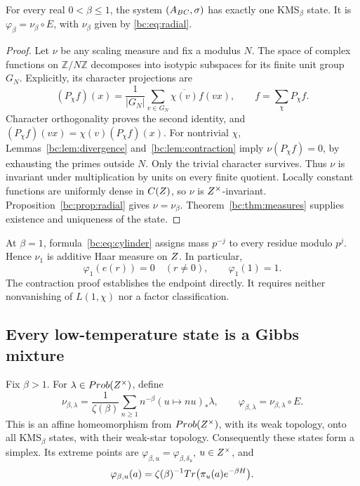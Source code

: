 \begin{theorem}\label{bc:thm:high}
For every real \(0<\beta\leq1\), the system \((A_{BC},\sigma)\) has
exactly one KMS\(_\beta\) state. It is
\(\varphi_\beta=\nu_\beta\circ E\), with \(\nu_\beta\) given by
\eqref{bc:eq:radial}.
\end{theorem}

\begin{proof}
Let \(\nu\) be any scaling measure and fix a modulus \(N\).
The space of complex functions on \(\mathbb Z/N\mathbb Z\) decomposes
into isotypic subspaces for its finite unit group \(G_N\).
Explicitly, its character projections are
\[
 (P_\chi f)(x)=\frac1{|G_N|}\sum_{v\in G_N}
                         \overline{\chi(v)}f(vx),
 \qquad f=\sum_\chi P_\chi f.
\]
Character orthogonality proves the second identity, and
\((P_\chi f)(vx)=\chi(v)(P_\chi f)(x)\).
For nontrivial \(\chi\), Lemmas~\ref{bc:lem:divergence}
and~\ref{bc:lem:contraction} imply \(\nu(P_\chi f)=0\), by exhausting
the primes outside \(N\). Only the trivial character survives.
Thus \(\nu\) is invariant under multiplication by units on every
finite quotient. Locally constant functions are uniformly dense in
\(C(Z)\), so \(\nu\) is \(Z^{\times}\)-invariant.
Proposition~\ref{bc:prop:radial} gives \(\nu=\nu_\beta\).
Theorem~\ref{bc:thm:measures} supplies existence and uniqueness of the state.
\end{proof}

At \(\beta=1\), formula~\eqref{bc:eq:cylinder} assigns mass \(p^{-j}\)
to every residue modulo \(p^j\). Hence \(\nu_1\) is additive Haar
measure on \(Z\). In particular,
\begin{equation}\label{bc:eq:critical-phase}
 \varphi_1(e(r))=0\quad(r\ne0),\qquad \varphi_1(1)=1.
\end{equation}
The contraction proof establishes the endpoint directly. It requires
neither nonvanishing of \(L(1,\chi)\) nor a factor classification.

\subsection{Every low-temperature state is a Gibbs mixture}

\begin{theorem}\label{bc:thm:low}
Fix \(\beta>1\). For \(\lambda\in Prob(Z^{\times})\), define
\begin{equation}\label{bc:eq:gibbs-measure}
 \nu_{\beta,\lambda}
  =\frac1{\zeta(\beta)}\sum_{n\geq1}n^{-\beta}(u\mapsto nu)_*\lambda,
 \qquad \varphi_{\beta,\lambda}=\nu_{\beta,\lambda}\circ E.
\end{equation}
This is an affine homeomorphism from \(Prob(Z^{\times})\), with its weak
topology, onto all KMS\(_\beta\) states, with their weak-star topology.
Consequently these states form a simplex. Its extreme points are
\(\varphi_{\beta,u}=\varphi_{\beta,\delta_u}\), \(u\in Z^{\times}\), and
\begin{equation}\label{bc:eq:gibbs-state}
 \varphi_{\beta,u}(a)
   =\zeta(\beta)^{-1}Tr\big(\pi_u(a)e^{-\beta H}\big).
\end{equation}
\end{theorem}

